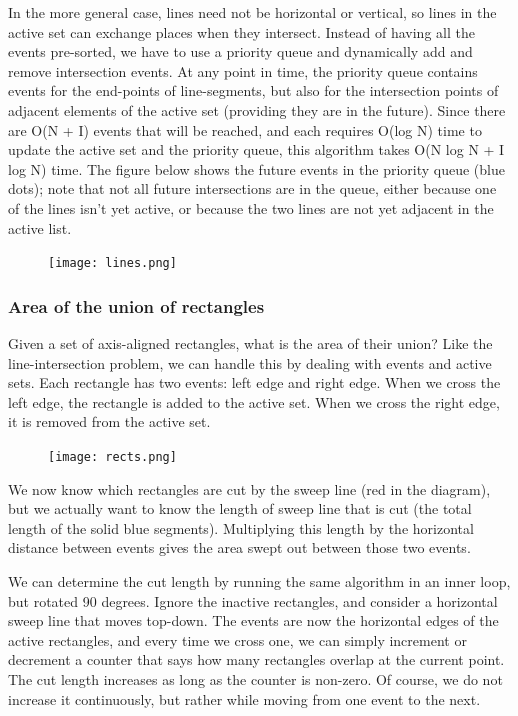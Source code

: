 \documentclass[a4paper,12pt]{article}
\begin{document}
In the more general case, lines need not be horizontal or vertical, so lines in the active 
set can exchange places when they intersect. Instead of having all the events pre-sorted, we 
have to use a priority queue and dynamically add and remove intersection events. At any 
point in time, the priority queue contains events for the end-points of line-segments, but 
also for the intersection points of adjacent elements of the active set (providing they are 
in the future). Since there are O(N + I) events that will be reached, and each requires 
O(log N) time to update the active set and the priority queue, this algorithm takes
O(N log N + I log N) time. The figure below shows the future events in the priority queue 
(blue dots); note that not all future intersections are in the queue, either because one of 
the lines isn't yet active, or because the two lines are not yet adjacent in the active list.

\begin{figure}[ht]
  \centering
  \texttt{[image: lines.png]}
\end{figure}

\subsubsection{Area of the union of rectangles}

Given a set of axis-aligned rectangles, what is the area of their union? Like the 
line-intersection problem, we can handle this by dealing with events and active sets. 
Each rectangle has two events: left edge and right edge. When we cross the left edge, 
the rectangle is added to the active set. When we cross the right edge, it is removed from 
the active set.

\begin{figure}[ht]
  \centering
  \texttt{[image: rects.png]}
\end{figure}

We now know which rectangles are cut by the sweep line (red in the diagram), but we 
actually want to know the length of sweep line that is cut (the total length of the 
solid blue segments). Multiplying this length by the horizontal distance between events 
gives the area swept out between those two events.

We can determine the cut length by running the same algorithm in an inner loop, but rotated 
90 degrees. Ignore the inactive rectangles, and consider a horizontal sweep line that moves 
top-down. The events are now the horizontal edges of the active rectangles, and every time 
we cross one, we can simply increment or decrement a counter that says how many rectangles 
overlap at the current point. The cut length increases as long as the counter is non-zero. 
Of course, we do not increase it continuously, but rather while moving from one event to the 
next.
\end{document}
